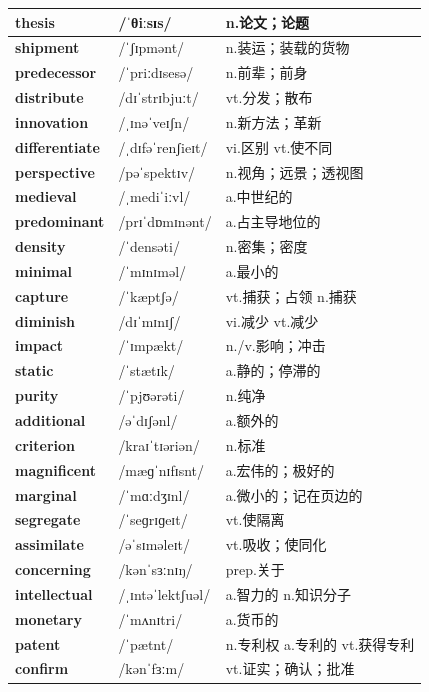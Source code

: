 \documentclass[14pt,a4paper]{extarticle}
\begin{document}
\begin{longtable}{ p{} p{} p{} }
\textbf{thesis} & /ˈθiːsɪs/ & n.论文；论题 \\ \hline
\textbf{shipment} & /ˈʃɪpmənt/ & n.装运；装载的货物 \\ \hline
\textbf{predecessor} & /ˈpriːdɪsesə/ & n.前辈；前身 \\ \hline
\textbf{distribute} & /dɪˈstrɪbjuːt/ & vt.分发；散布 \\ \hline
\textbf{innovation} & /ˌɪnəˈveɪʃn/ & n.新方法；革新 \\ \hline
\textbf{differentiate} & /ˌdɪfəˈrenʃieɪt/ & vi.区别 \quad vt.使不同 \\ \hline
\textbf{perspective} & /pəˈspektɪv/ & n.视角；远景；透视图 \\ \hline
\textbf{medieval} & /ˌmediˈiːvl/ & a.中世纪的 \\ \hline
\textbf{predominant} & /prɪˈdɒmɪnənt/ & a.占主导地位的 \\ \hline
\textbf{density} & /ˈdensəti/ & n.密集；密度 \\ \hline
\textbf{minimal} & /ˈmɪnɪməl/ & a.最小的 \\ \hline
\textbf{capture} & /ˈkæptʃə/ & vt.捕获；占领 \quad n.捕获 \\ \hline
\textbf{diminish} & /dɪˈmɪnɪʃ/ & vi.减少 \quad vt.减少 \\ \hline
\textbf{impact} & /ˈɪmpækt/ & n./v.影响；冲击 \\ \hline
\textbf{static} & /ˈstætɪk/ & a.静的；停滞的 \\ \hline
\textbf{purity} & /ˈpjʊərəti/ & n.纯净 \\ \hline
\textbf{additional} & /əˈdɪʃənl/ & a.额外的 \\ \hline
\textbf{criterion} & /kraɪˈtɪəriən/ & n.标准 \\ \hline
\textbf{magnificent} & /mæɡˈnɪfɪsnt/ & a.宏伟的；极好的 \\ \hline
\textbf{marginal} & /ˈmɑːdʒɪnl/ & a.微小的；记在页边的 \\ \hline
\textbf{segregate} & /ˈseɡrɪɡeɪt/ & vt.使隔离 \\ \hline
\textbf{assimilate} & /əˈsɪməleɪt/ & vt.吸收；使同化 \\ \hline
\textbf{concerning} & /kənˈsɜːnɪŋ/ & prep.关于 \\ \hline
\textbf{intellectual} & /ˌɪntəˈlektʃuəl/ & a.智力的 \quad n.知识分子 \\ \hline
\textbf{monetary} & /ˈmʌnɪtri/ & a.货币的 \\ \hline
\textbf{patent} & /ˈpætnt/ & n.专利权 \quad a.专利的 \quad vt.获得专利 \\ \hline
\textbf{confirm} & /kənˈfɜːm/ & vt.证实；确认；批准 \\ \hline
\end{longtable}
\end{document}
